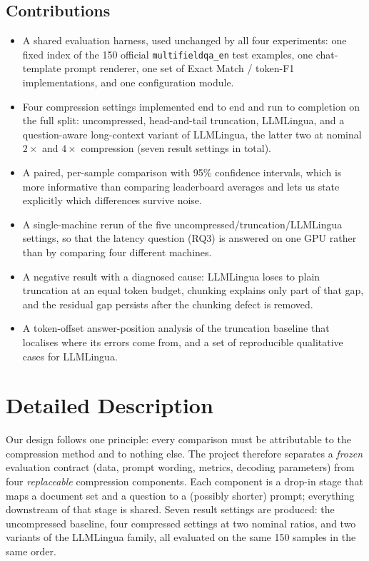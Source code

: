 \documentclass[10pt,a4paper,twocolumn]{article}
\begin{document}
\subsection{Contributions}

\begin{itemize}
    \item A shared evaluation harness, used unchanged by all four experiments: one
    fixed index of the 150 official \texttt{multifieldqa\_en} test examples, one
    chat-template prompt renderer, one set of Exact Match / token-F1
    implementations, and one configuration module.
    \item Four compression settings implemented end to end and run to completion on
    the full split: uncompressed, head-and-tail truncation, LLMLingua, and a
    question-aware long-context variant of LLMLingua, the latter two at nominal
    $2\times$ and $4\times$ compression (seven result settings in total).
    \item A paired, per-sample comparison with 95\% confidence intervals, which is
    more informative than comparing leaderboard averages and lets us state
    explicitly which differences survive noise.
    \item A single-machine rerun of the five uncompressed/truncation/LLMLingua
    settings, so that the latency question (RQ3) is answered on one GPU rather
    than by comparing four different machines.
    \item A negative result with a diagnosed cause: LLMLingua loses to plain
    truncation at an equal token budget, chunking explains only part of that gap,
    and the residual gap persists after the chunking defect is removed.
    \item A token-offset answer-position analysis of the truncation baseline that
    localises where its errors come from, and a set of reproducible qualitative
    cases for LLMLingua.
\end{itemize}

\section{Detailed Description}

Our design follows one principle: every comparison must be attributable to the
compression method and to nothing else. The project therefore separates a
\emph{frozen} evaluation contract (data, prompt wording, metrics, decoding
parameters) from four \emph{replaceable} compression components. Each component is
a drop-in stage that maps a document set and a question to a (possibly shorter)
prompt; everything downstream of that stage is shared. Seven result settings are
produced: the uncompressed baseline, four compressed settings at two nominal
ratios, and two variants of the LLMLingua family, all evaluated on the same 150
samples in the same order.
\end{document}
